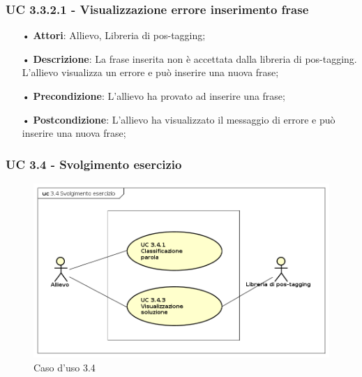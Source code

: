
\subsubsection{UC 3.3.2.1 - Visualizzazione errore inserimento frase}
\begin{itemize}
\item[•]\textbf{Attori}: Allievo, Libreria di pos-tagging;
\item[•]\textbf{Descrizione}: La frase inserita non è accettata dalla libreria di pos-tagging. L'allievo visualizza un errore e può inserire una nuova frase;
\item[•]\textbf{Precondizione}: L'allievo ha provato ad inserire una frase;
\item[•]\textbf{Postcondizione}: L'allievo ha visualizzato il messaggio di errore e può inserire una nuova frase;
\end{itemize}

\subsubsection{UC 3.4 - Svolgimento esercizio}

\begin{figure}[H]
\centering
\includegraphics[width=17cm]{img/UC34.png} 
\caption{Caso d'uso 3.4}\label{fig:34}
\end{figure}

